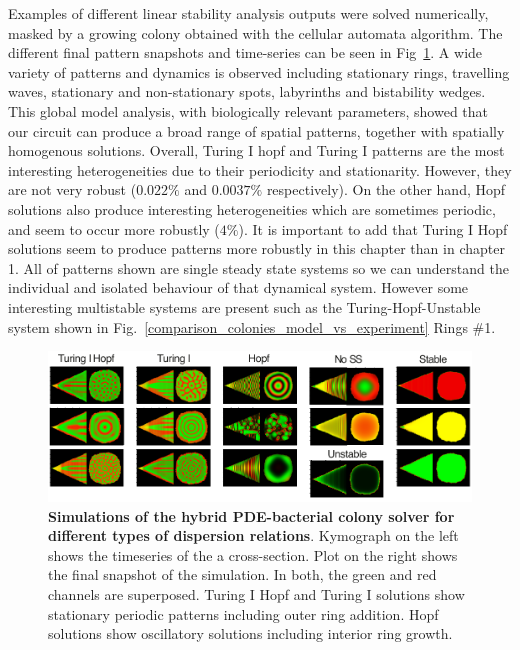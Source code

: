 Examples of different linear stability analysis outputs were solved numerically, masked by a growing colony obtained with the cellular automata algorithm.
The different final pattern snapshots and time-series can be seen in Fig~\ref{system_class_simulations}.
A wide variety of patterns and dynamics is observed including stationary rings, travelling waves, stationary and non-stationary spots, labyrinths and bistability wedges.
This global model analysis, with biologically relevant parameters, showed that our circuit can produce a broad range of spatial patterns, together with spatially homogenous solutions.
Overall, Turing I hopf and Turing I patterns are the most interesting heterogeneities due to their periodicity and stationarity.
However, they are not very robust ($0.022\%$ and $0.0037\%$ respectively).
On the other hand, Hopf solutions also produce interesting heterogeneities which are sometimes periodic, and seem to occur more robustly ($4\%$).
It is important to add that Turing I Hopf solutions seem to produce patterns more robustly in this chapter than in chapter 1.
All of patterns shown are single steady state systems so we can understand the individual and isolated behaviour of that dynamical system.
However some interesting multistable systems are present such as the Turing-Hopf-Unstable system shown in Fig.~\ref{comparison_colonies_model_vs_experiment} Rings \#1.
\begin{figure}[H]
    \centering

    \includegraphics[width=1\textwidth]{chapters/Chapter 3/system_class_simulations}
    \caption{\textbf{Simulations of the hybrid PDE-bacterial colony solver for different types of dispersion relations}. Kymograph on the left shows the timeseries of the a cross-section. Plot on the right shows the final snapshot of the simulation. In both, the green and red channels are superposed. Turing I Hopf and Turing I solutions show stationary periodic patterns including outer ring addition. Hopf solutions show oscillatory solutions including interior ring growth.}
    \label{system_class_simulations}
\end{figure}


